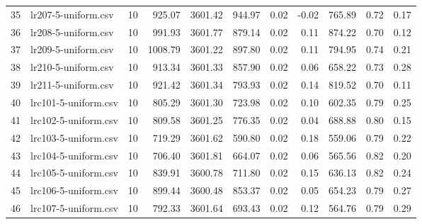 \begin{tabular}{llrrrrrrrrr}
35 &   lr207-5-uniform.csv &         10 &           925.07 &     3601.42 &             944.97 &           0.02 &     -0.02 &              765.89 &            0.72 &       0.17 \\
36 &   lr208-5-uniform.csv &         10 &           991.93 &     3601.77 &             879.14 &           0.02 &      0.11 &              874.22 &            0.70 &       0.12 \\
37 &   lr209-5-uniform.csv &         10 &          1008.79 &     3601.22 &             897.80 &           0.02 &      0.11 &              794.95 &            0.74 &       0.21 \\
38 &   lr210-5-uniform.csv &         10 &           913.34 &     3601.33 &             857.90 &           0.02 &      0.06 &              658.22 &            0.73 &       0.28 \\
39 &   lr211-5-uniform.csv &         10 &           921.42 &     3601.34 &             793.93 &           0.02 &      0.14 &              819.52 &            0.70 &       0.11 \\
40 &  lrc101-5-uniform.csv &         10 &           805.29 &     3601.30 &             723.98 &           0.02 &      0.10 &              602.35 &            0.79 &       0.25 \\
41 &  lrc102-5-uniform.csv &         10 &           809.58 &     3601.25 &             776.35 &           0.02 &      0.04 &              688.88 &            0.80 &       0.15 \\
42 &  lrc103-5-uniform.csv &         10 &           719.29 &     3601.62 &             590.80 &           0.02 &      0.18 &              559.06 &            0.79 &       0.22 \\
43 &  lrc104-5-uniform.csv &         10 &           706.40 &     3601.81 &             664.07 &           0.02 &      0.06 &              565.56 &            0.82 &       0.20 \\
44 &  lrc105-5-uniform.csv &         10 &           839.91 &     3600.78 &             711.80 &           0.02 &      0.15 &              636.13 &            0.82 &       0.24 \\
45 &  lrc106-5-uniform.csv &         10 &           899.44 &     3600.48 &             853.37 &           0.02 &      0.05 &              654.23 &            0.79 &       0.27 \\
46 &  lrc107-5-uniform.csv &         10 &           792.33 &     3601.64 &             693.43 &           0.02 &      0.12 &              564.76 &            0.79 &       0.29 \\

\end{tabular}

